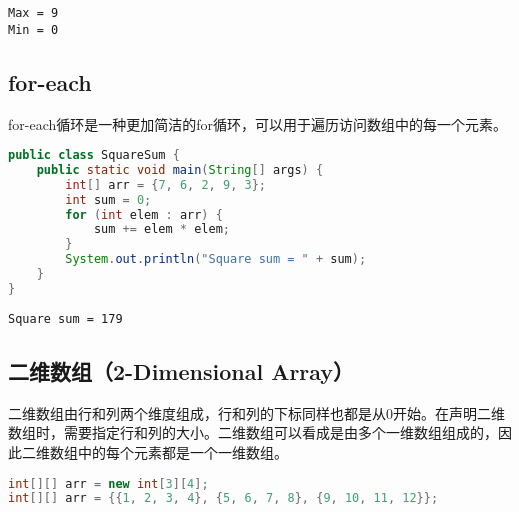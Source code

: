 \begin{tcolorbox}
	\begin{verbatim}
Max = 9
Min = 0
	\end{verbatim}
\end{tcolorbox}

\vspace{0.5cm}

\subsection{for-each}

for-each循环是一种更加简洁的for循环，可以用于遍历访问数组中的每一个元素。\\


\begin{lstlisting}[language=Java]
public class SquareSum {
	public static void main(String[] args) {
		int[] arr = {7, 6, 2, 9, 3};
		int sum = 0;
		for (int elem : arr) {
			sum += elem * elem;
		}
		System.out.println("Square sum = " + sum);
	}
}
\end{lstlisting}

\begin{tcolorbox}
	\begin{verbatim}
Square sum = 179
	\end{verbatim}
\end{tcolorbox}

\vspace{0.5cm}

\subsection{二维数组（2-Dimensional Array）}

二维数组由行和列两个维度组成，行和列的下标同样也都是从0开始。在声明二维数组时，需要指定行和列的大小。二维数组可以看成是由多个一维数组组成的，因此二维数组中的每个元素都是一个一维数组。

\vspace{-0.5cm}

\begin{lstlisting}[language=Java]
int[][] arr = new int[3][4];
int[][] arr = {{1, 2, 3, 4}, {5, 6, 7, 8}, {9, 10, 11, 12}};
\end{lstlisting}

\begin{table}[H]
	\centering
\end{table}

